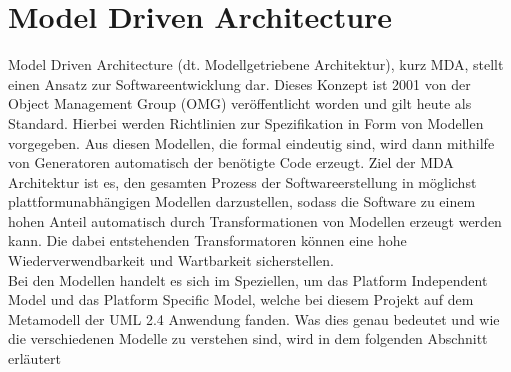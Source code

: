 \section{Model Driven Architecture} \label{MDA}
Model Driven Architecture (dt. Modellgetriebene Architektur), kurz MDA, stellt
einen Ansatz zur Softwareentwicklung dar. Dieses Konzept ist 2001 von der
Object Management Group (OMG) veröffentlicht worden und gilt heute als
Standard. Hierbei werden Richtlinien zur Spezifikation in Form von Modellen vorgegeben.
Aus diesen Modellen, die formal eindeutig sind, wird dann mithilfe von Generatoren
automatisch der benötigte Code erzeugt. Ziel der MDA Architektur ist es, den gesamten Prozess der Softwareerstellung in möglichst plattformunabhängigen Modellen darzustellen, sodass die Software zu einem hohen Anteil automatisch durch Transformationen von Modellen erzeugt werden kann. Die dabei entstehenden Transformatoren können eine hohe Wiederverwendbarkeit und Wartbarkeit sicherstellen.\cite[S. 79 f.]{bib:MDA1}\\
Bei den Modellen handelt es sich im Speziellen, um das Platform Independent Model und das Platform Specific Model, welche bei diesem Projekt auf dem Metamodell der UML 2.4 Anwendung fanden.
Was dies genau bedeutet und wie die verschiedenen Modelle zu verstehen sind, wird in dem folgenden Abschnitt erläutert
